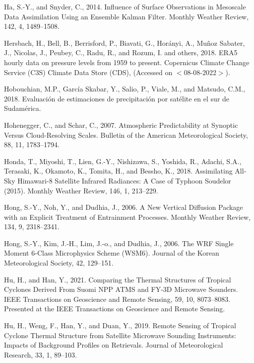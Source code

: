 \documentclass[12pt,oneside,a4paper]{reedthesis}
\begin{document}
\leavevmode\hypertarget{ref-ha2014}{}%
Ha, S.-Y., and Snyder, C., 2014. Influence of Surface Observations in Mesoscale Data Assimilation Using an Ensemble Kalman Filter. Monthly Weather Review, 142, 4, 1489--1508.

\leavevmode\hypertarget{ref-era5pressure}{}%
Hersbach, H., Bell, B., Berrisford, P., Biavati, G., Horányi, A., Muñoz Sabater, J., Nicolas, J., Peubey, C., Radu, R., and Rozum, I. and others, 2018. ERA5 hourly data on pressure levels from 1959 to present. Copernicus Climate Change Service (C3S) Climate Data Store (CDS), (Accessed on \(<\)08-08-2022\(>\)).

\leavevmode\hypertarget{ref-hobouchian2018}{}%
Hobouchian, M.P., García Skabar, Y., Salio, P., Viale, M., and Matsudo, C.M., 2018. Evaluación de estimaciones de precipitación por satélite en el sur de Sudamérica.

\leavevmode\hypertarget{ref-hohenegger2007}{}%
Hohenegger, C., and Schar, C., 2007. Atmospheric Predictability at Synoptic Versus Cloud-Resolving Scales. Bulletin of the American Meteorological Society, 88, 11, 1783--1794.

\leavevmode\hypertarget{ref-honda2018}{}%
Honda, T., Miyoshi, T., Lien, G.-Y., Nishizawa, S., Yoshida, R., Adachi, S.A., Terasaki, K., Okamoto, K., Tomita, H., and Bessho, K., 2018. Assimilating All-Sky Himawari-8 Satellite Infrared Radiances: A Case of Typhoon Soudelor (2015). Monthly Weather Review, 146, 1, 213--229.

\leavevmode\hypertarget{ref-hong2006}{}%
Hong, S.-Y., Noh, Y., and Dudhia, J., 2006. A New Vertical Diffusion Package with an Explicit Treatment of Entrainment Processes. Monthly Weather Review, 134, 9, 2318--2341.

\leavevmode\hypertarget{ref-hong2006a}{}%
Hong, S.-Y., Kim, J.-H., Lim, J.-o., and Dudhia, J., 2006. The WRF Single Moment 6-Class Microphysics Scheme (WSM6). Journal of the Korean Meteorological Society, 42, 129--151.

\leavevmode\hypertarget{ref-hu2021}{}%
Hu, H., and Han, Y., 2021. Comparing the Thermal Structures of Tropical Cyclones Derived From Suomi NPP ATMS and FY-3D Microwave Sounders. IEEE Transactions on Geoscience and Remote Sensing, 59, 10, 8073--8083. Presented at the IEEE Transactions on Geoscience and Remote Sensing.

\leavevmode\hypertarget{ref-hu2019}{}%
Hu, H., Weng, F., Han, Y., and Duan, Y., 2019. Remote Sensing of Tropical Cyclone Thermal Structure from Satellite Microwave Sounding Instruments: Impacts of Background Profiles on Retrievals. Journal of Meteorological Research, 33, 1, 89--103.
\end{document}
